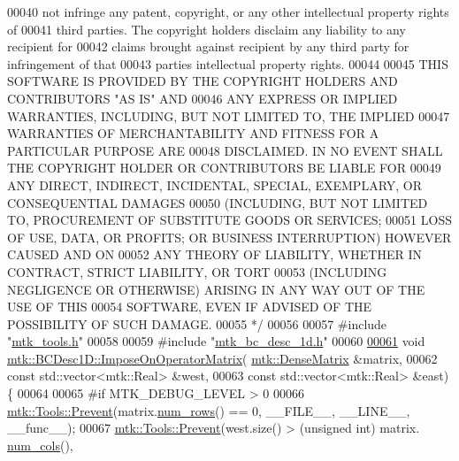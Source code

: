 \begin{DoxyCode}
00040 \textcolor{comment}{not infringe any patent, copyright, or any other intellectual property rights of}
00041 \textcolor{comment}{third parties. The copyright holders disclaim any liability to any recipient for}
00042 \textcolor{comment}{claims brought against recipient by any third party for infringement of that}
00043 \textcolor{comment}{parties intellectual property rights.}
00044 \textcolor{comment}{}
00045 \textcolor{comment}{THIS SOFTWARE IS PROVIDED BY THE COPYRIGHT HOLDERS AND CONTRIBUTORS "AS IS" AND}
00046 \textcolor{comment}{ANY EXPRESS OR IMPLIED WARRANTIES, INCLUDING, BUT NOT LIMITED TO, THE IMPLIED}
00047 \textcolor{comment}{WARRANTIES OF MERCHANTABILITY AND FITNESS FOR A PARTICULAR PURPOSE ARE}
00048 \textcolor{comment}{DISCLAIMED. IN NO EVENT SHALL THE COPYRIGHT HOLDER OR CONTRIBUTORS BE LIABLE FOR}
00049 \textcolor{comment}{ANY DIRECT, INDIRECT, INCIDENTAL, SPECIAL, EXEMPLARY, OR CONSEQUENTIAL DAMAGES}
00050 \textcolor{comment}{(INCLUDING, BUT NOT LIMITED TO, PROCUREMENT OF SUBSTITUTE GOODS OR SERVICES;}
00051 \textcolor{comment}{LOSS OF USE, DATA, OR PROFITS; OR BUSINESS INTERRUPTION) HOWEVER CAUSED AND ON}
00052 \textcolor{comment}{ANY THEORY OF LIABILITY, WHETHER IN CONTRACT, STRICT LIABILITY, OR TORT}
00053 \textcolor{comment}{(INCLUDING NEGLIGENCE OR OTHERWISE) ARISING IN ANY WAY OUT OF THE USE OF THIS}
00054 \textcolor{comment}{SOFTWARE, EVEN IF ADVISED OF THE POSSIBILITY OF SUCH DAMAGE.}
00055 \textcolor{comment}{*/}
00056 
00057 \textcolor{preprocessor}{#include "\hyperlink{mtk__tools_8h}{mtk\_tools.h}"}
00058 
00059 \textcolor{preprocessor}{#include "\hyperlink{mtk__bc__desc__1d_8h}{mtk\_bc\_desc\_1d.h}"}
00060 
\hypertarget{mtk__bc__desc__1d_8cc_source_l00061}{}\hyperlink{classmtk_1_1BCDesc1D_a5e5dcda1780b9aa404e836c4c27ac08f}{00061} \textcolor{keywordtype}{void} \hyperlink{classmtk_1_1BCDesc1D_a5e5dcda1780b9aa404e836c4c27ac08f}{mtk::BCDesc1D::ImposeOnOperatorMatrix}(
      \hyperlink{classmtk_1_1DenseMatrix}{mtk::DenseMatrix} &matrix,
00062     \textcolor{keyword}{const} std::vector<mtk::Real> &west,
00063     \textcolor{keyword}{const} std::vector<mtk::Real> &east) \{
00064 
00065 \textcolor{preprocessor}{  #if MTK\_DEBUG\_LEVEL > 0}
00066   \hyperlink{classmtk_1_1Tools_afe5bb096309258e2e72503fd7b41c7e0}{mtk::Tools::Prevent}(matrix.\hyperlink{classmtk_1_1DenseMatrix_a17d8d3b9cc0926044b6972dd190a5c21}{num\_rows}() == 0, \_\_FILE\_\_, \_\_LINE\_\_, \_\_func\_\_);
00067   \hyperlink{classmtk_1_1Tools_afe5bb096309258e2e72503fd7b41c7e0}{mtk::Tools::Prevent}(west.size() > (\textcolor{keywordtype}{unsigned} int) matrix.
      \hyperlink{classmtk_1_1DenseMatrix_af6f78373aaf2136f0c78974d7c8de0a8}{num\_cols}(),

\end{DoxyCode}
